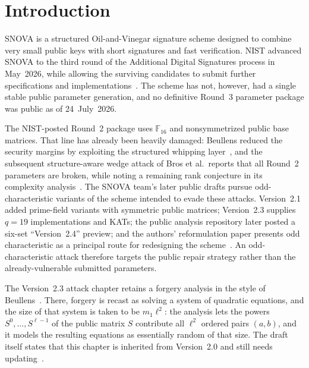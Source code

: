 \documentclass[11pt]{article}
\newcommand{\F}{\mathbb F}
\newcommand{\SNOVA}{\textsf{SNOVA}}
\begin{document}
\section{Introduction}\label{sec:intro}

\SNOVA{} is a structured Oil-and-Vinegar signature scheme designed to combine very small public keys with short signatures and fast verification.  NIST advanced \SNOVA{} to the third round of the Additional Digital Signatures process in May~2026, while allowing the surviving candidates to submit further specifications and implementations~\cite{NISTIR8610,NISTRound3}.  The scheme has not, however, had a single stable public parameter generation, and no definitive Round~3 parameter package was public as of 24~July~2026.

The NIST-posted Round~2 package uses $\F_{16}$ and nonsymmetrized public base matrices.  That line has already been heavily damaged: Beullens reduced the security margins by exploiting the structured whipping layer~\cite{Beullens2024SNOVA}, and the subsequent structure-aware wedge attack of Bros et al.\ reports that all Round~2 parameters are broken, while noting a remaining rank conjecture in its complexity analysis~\cite{BrosEtAl2026SNOVAWedge}.  The \SNOVA{} team's later public drafts pursue odd-characteristic variants of the scheme intended to evade these attacks.  Version~2.1 added prime-field variants with symmetric public matrices; Version~2.3 supplies $q=19$ implementations and KATs; the public analysis repository later posted a six-set ``Version~2.4'' preview; and the authors' reformulation paper presents odd characteristic as a principal route for redesigning the scheme~\cite{SNOVA23,SNOVA24Preview,DingEtAl2026Reformulating}.  An odd-characteristic attack therefore targets the public repair strategy rather than the already-vulnerable submitted parameters.

The Version~2.3 attack chapter retains a forgery analysis in the style of Beullens~\cite{Beullens2024SNOVA}.  There, forgery is recast as solving a system of quadratic equations, and the size of that system is taken to be $m_1\ell^2$: the analysis lets the powers $S^0,\dots,S^{\ell-1}$ of the public matrix $S$ contribute all $\ell^2$ ordered pairs $(a,b)$, and it models the resulting equations as essentially random of that size.  The draft itself states that this chapter is inherited from Version~2.0 and still needs updating~\cite{SNOVA23}.
\end{document}
